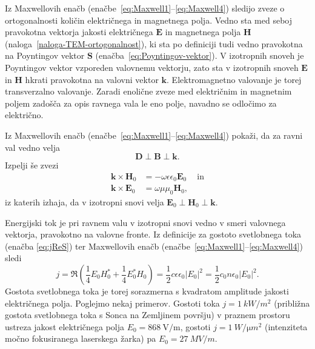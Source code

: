 Iz Maxwellovih enačb (enačbe~\ref{eq:Maxwell1}--\ref{eq:Maxwell4}) sledijo zveze o ortogonalnosti
količin električnega in magnetnega polja. Vedno sta med seboj pravokotna vektorja
jakosti električnega $\mathbf{E}$ in magnetnega polja $\mathbf{H}$ 
(naloga~\ref{naloga-TEM-ortogonalnost}), ki sta po definiciji tudi vedno 
pravokotna na Poyntingov vektor $\mathbf{S}$ (enačba~\ref{eq:Poyntingov-vektor}). V
izotropnih snoveh je Poyntingov vektor vzporeden valovnemu vektorju, zato
sta v izotropnih snoveh $\mathbf{E}$ in $\mathbf{H}$ hkrati pravokotna 
na valovni vektor $\mathbf{k}$. Elektromagnetno valovanje je torej transverzalno valovanje. 
Zaradi enolične zveze med električnim in magnetnim poljem zadošča
za opis ravnega vala le eno polje, navadno se odločimo za električno.

\begin{definition}
\label{naloga-TEM-ortogonalnost}
Iz Maxwellovih enačb (enačbe~\ref{eq:Maxwell1}--\ref{eq:Maxwell4}) pokaži, 
da za ravni val vedno velja 
\begin{equation}
\mathbf{D} \perp \mathbf{B} \perp \mathbf{k}.  
\end{equation}
Izpelji še zvezi
\begin{align}
\mathbf{k}\times\mathbf{H}_{0} & =-\omega\epsilon\epsilon_{0}\mathbf{E}_{0}\label{eq:TEM-pogoj1}\
\quad \mathrm{in}\\
\mathbf{k}\times\mathbf{E}_{0} & =\omega\mu\mu_{0}\mathbf{H}_{0}\label{eq:TEM-pogoj2},
\end{align}
iz katerih izhaja, da v izotropni snovi velja $\mathbf{E}_0\perp \mathbf{H}_0\perp 
\mathbf{k}$.
\end{definition}

Energijski tok je pri ravnem valu v izotropni snovi vedno v smeri valovnega vektorja, pravokotno
na valovne fronte. Iz definicije za gostoto svetlobnega toka (enačba \ref{eq:jReS}) 
ter Maxwellovih enačb (enačbe~\ref{eq:Maxwell1}--\ref{eq:Maxwell4}) 
sledi\index{Gostota energijskega toka}
\begin{equation}
j=\Re\left(\frac{1}{4}E_{0}H_{0}^{*}+\frac{1}{4}E_{0}^*H_{0}\right)=
\frac{1}{2}c\epsilon\epsilon_{0}\left|E_{0}\right|^{2}=\frac{1}{2}c_{0}n\epsilon_{0}
\left|E_{0}\right|^{2}.
\label{eq:j}
\end{equation}
Gostota svetlobnega toka je torej sorazmerna
s kvadratom amplitude jakosti električnega polja. Poglejmo nekaj primerov.
Gostoti toka $j=1~\si{kW/m^{2}}$
(približna gostota svetlobnega toka s Sonca na Zemljinem površju) v praznem prostoru ustreza 
jakost električnega polja $E_{0}=868~\si{\volt/\meter}$, gostoti $j=1~\si{W/\micro m^{2}}$ 
(intenziteta močno fokusiranega laserskega žarka) pa $E_{0}=27~\si{MV/m}$. 

